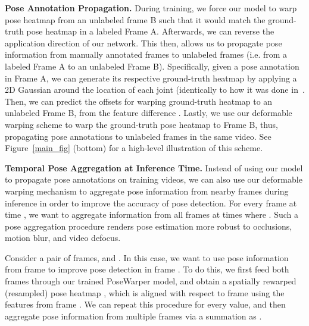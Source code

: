 \documentclass{article}
\begin{document}
\textbf{Pose Annotation Propagation.} During training, we force our model to warp pose heatmap \smash{} from an unlabeled frame B such that it would match the ground-truth pose heatmap in a labeled Frame A. Afterwards, we can reverse the application direction of our network. This then, allows us to propagate pose information from manually annotated frames to unlabeled frames (i.e. from a labeled Frame A to an unlabeled Frame B).  Specifically, given a pose annotation in Frame A, we can generate its respective ground-truth heatmap  \smash{} by applying a 2D Gaussian around the location of each joint (identically to how it was done in~\cite{xiao2018simple,sun2019deep}. Then, we can predict the offsets for warping ground-truth heatmap  \smash{} to an unlabeled Frame B, from the feature difference \smash{}. Lastly, we use our deformable warping scheme to warp the ground-truth pose heatmap \smash{} to Frame B, thus, propagating pose annotations to unlabeled frames in the same video. See Figure~\ref{main_fig} (bottom) for a high-level illustration of this scheme.








\textbf{Temporal Pose Aggregation at Inference Time.}
Instead of using our model to propagate pose annotations on training videos, we can also use our deformable warping mechanism to aggregate pose information from nearby frames during inference in order to improve the accuracy of pose detection. For every frame at time , we want to aggregate information from all frames at times  where . Such a pose aggregation procedure renders pose estimation more robust to occlusions, motion blur, and video defocus.

Consider a pair of frames,  and . In this case, we want to use pose information from frame  to improve pose detection in frame .  To do this, we first feed both frames through our trained PoseWarper model, and obtain a spatially rewarped (resampled) pose heatmap \smash{}, which is aligned with respect to frame  using the features from frame . We can repeat this procedure for every  value, and then aggregate pose information from multiple frames via a summation as . \
\end{document}
